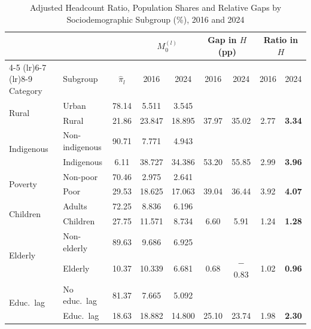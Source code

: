 \documentclass[11pt, a4paper]{article}
\begin{document}
\begin{table}[htbp]
\centering
\caption{Adjusted Headcount Ratio, Population Shares and Relative Gaps by Sociodemographic Subgroup (\%), 2016 and 2024}
\small
\begin{tabularx}{\textwidth}{X X c cc cc cc}
\toprule
\toprule
 & & & \multicolumn{2}{c}{$M_0^{(l)}$} & \multicolumn{2}{c}{Gap in $H$ (pp)} & \multicolumn{2}{c}{Ratio in $H$} \\
\cmidrule(lr){4-5} \cmidrule(lr){6-7} \cmidrule(lr){8-9}
Category & Subgroup & $\hat{\pi}_l$ & 2016 & 2024 & 2016 & 2024 & 2016 & 2024 \\ \midrule
\multirow{2}{*}{Rural}
 & Urban          & 78.14 & 5.511  & 3.545  &       &       &      &      \\
 & Rural          & 21.86 & 23.847 & 18.895 & 37.97 & 35.02 & 2.77 & \textbf{3.34} \\[3pt]
\multirow{2}{*}{Indigenous}
 & Non-indigenous & 90.71 & 7.771  & 4.943  &       &       &      &      \\
 & Indigenous     &  6.11 & 38.727 & 34.386 & 53.20 & 55.85 & 2.99 & \textbf{3.96} \\[3pt]
\multirow{2}{*}{Poverty}
 & Non-poor       & 70.46 & 2.975  & 2.641  &       &       &      &      \\
 & Poor           & 29.53 & 18.625 & 17.063 & 39.04 & 36.44 & 3.92 & \textbf{4.07} \\[3pt]
\multirow{2}{*}{Children}
 & Adults         & 72.25 & 8.836  & 6.196  &       &       &      &      \\
 & Children       & 27.75 & 11.571 & 8.734  &  6.60 &  5.91 & 1.24 & \textbf{1.28} \\[3pt]
\multirow{2}{*}{Elderly}
 & Non-elderly    & 89.63 & 9.686  & 6.925  &       &       &      &      \\
 & Elderly        & 10.37 & 10.339 & 6.681  &  0.68 & $-$0.83 & 1.02 & \textbf{0.96} \\[3pt]
\multirow{2}{*}{Educ.\ lag}
 & No educ.\ lag  & 81.37 & 7.665  & 5.092  &       &       &      &      \\
 & Educ.\ lag     & 18.63 & 18.882 & 14.800 & 25.10 & 23.74 & 1.98 & \textbf{2.30} \\
\bottomrule
\end{tabularx}
\begin{justify}
\scriptsize

\end{justify}
\end{table}
\end{document}
